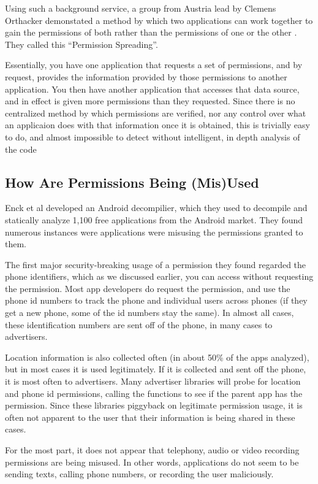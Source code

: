 \documentclass[12pt,pdftex]{article}
\begin{document}
\begin{doublespace}
Using such a background service, a group from Austria lead by Clemens Orthacker demonstated a method by which two applications can work together to gain the permissions of both rather than the permissions of one or the other \cite{perSpread}. They called this ``Permission Spreading''.

Essentially, you have one application that requests a set of permissions, and by request, provides the information provided by those permissions to another application.  You then have another application that accesses that data source, and in effect is given more permissions than they requested.  Since there is no centralized method by which permissions are verified, nor any control over what an applicaion does with that information once it is obtained, this is trivially easy to do, and almost impossible to detect without intelligent, in depth analysis of the code

\subsection{How Are Permissions Being (Mis)Used}
Enck et al developed an Android decompilier, which they used to decompile and statically analyze 1,100 free applications from the Android market.  They found numerous instances were applications were misusing the permissions granted to them. \cite{ded}

The first major security-breaking usage of a permission they found regarded the phone identifiers, which as we discussed earlier, you can access without requesting the permission.  Most app developers do request the permission, and use the  phone id numbers to track the phone and individual users across phones (if they get a new phone, some of the id numbers stay the same).  In almost all cases, these identification numbers are sent off of the phone, in many cases to advertisers.

Location information is also collected often (in about 50\% of the apps analyzed), but in most cases it is used legitimately.  If it is collected and sent off the phone, it is most often to advertisers.  Many advertiser libraries will probe for location and phone id permissions, calling the functions to see if the parent app has the permission.  Since these libraries piggyback on legitimate permission usage, it is often not apparent to the user that their information is being shared in these cases.

For the most part, it does not appear that telephony, audio or video recording permissions are being misused.  In other words, applications do not seem to be sending texts, calling phone numbers, or recording the user maliciously.


\end{doublespace}
\end{document}
